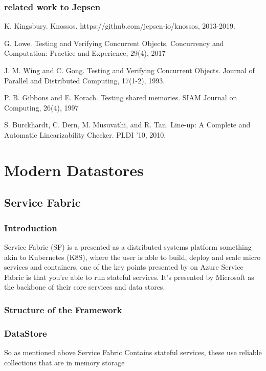 \documentclass[a4paper,10pt,titlepage]{report}
\begin{document}
\subsection{related work to Jepsen}


K. Kingsbury. Knossos.
https://github.com/jepsen-io/knossos, 2013-2019.

G. Lowe. Testing and Verifying Concurrent Objects.
Concurrency and Computation: Practice and
Experience, 29(4), 2017

J. M. Wing and C. Gong. Testing and Verifying
Concurrent Objects. Journal of Parallel and
Distributed Computing, 17(1-2), 1993.

P. B. Gibbons and E. Korach. Testing shared
memories. SIAM Journal on Computing, 26(4), 1997

S. Burckhardt, C. Dern, M. Musuvathi, and R. Tan.
Line-up: A Complete and Automatic Linearizability
Checker. PLDI ’10, 2010.



\chapter{Modern Datastores}


\section{Service Fabric}

\subsection{Introduction}

Service Fabric (SF) is a presented as a distributed systems platform something akin to Kubernetes (K8S), where the user is able to build, deploy and scale micro services and containers, one of the key points presented by on Azure Service Fabric is that you're able to run stateful services. It's presented by Microsoft as the backbone of their core services and data stores.


\subsection{Structure of the Framework}


\subsection{DataStore}

So as mentioned above Service Fabric Contains stateful services, these use reliable collections that are in memory storage
\end{document}
